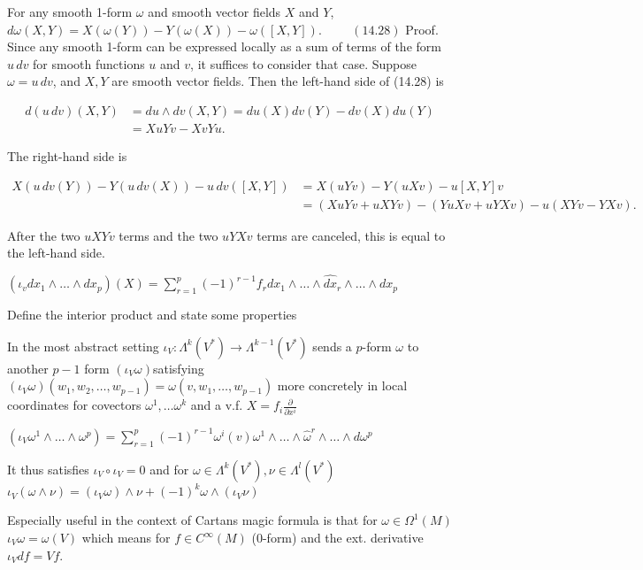 For any smooth 1-form \(\omega\) and smooth vector fields \( X \) and \( Y \), 
\(
d\omega(X,Y) = X(\omega(Y)) - Y(\omega(X)) - \omega([X, Y]). \hspace{1cm} (14.28)
\)
Proof.
Since any smooth 1-form can be expressed locally as a sum of terms of the form $u \, dv$ for smooth functions $u$ and $v$, it suffices to consider that case. 
Suppose \(\omega = u \, dv\), and \(X, Y\) are smooth vector fields. Then the left-hand side of (14.28) is

\[
\begin{aligned}
d(u \, dv)(X,Y) &= du \wedge dv(X,Y) = du(X) dv(Y) - dv(X) du(Y) \\
&= Xu Yv - Xv Yu. 
\end{aligned}
\]

The right-hand side is

\[
\begin{aligned}
X(u \, dv(Y)) - Y(u \, dv(X)) - u \, dv ([X, Y]) &= X(u Yv) - Y(u Xv) - u [X, Y] v \\
&= (Xu Yv + uXYv) - (Yu Xv + uYXv) - u(XYv - YXv). 
\end{aligned}
\]

After the two \(uXYv\) terms and the two \(uYXv\) terms are canceled, this is equal to the left-hand side.




\( (\iota_v dx_1 \wedge \dots \wedge dx_p)(X) = \sum^{p}_{r=1} (-1)^{r-1}f_r dx_1 \wedge \dots \wedge \hat{dx}_r \wedge \dots \wedge dx_p \)

Define the interior product and state some properties

In the most abstract setting \( \iota_V : \Lambda^k(V^\ast) \to \Lambda^{k-1}(V^\ast) \)
sends a \( p \)-form \( \omega \) to another \( p-1 \) form \( (\iota_V \omega) \)satisfying
\( (\iota_V\omega)(w_1, w_2, \dots, w_{p-1}) = \omega(v, w_1, \dots, w_{p-1})  \)
more concretely in local coordinates for covectors \( \omega^1, \dots \omega^k \) 
and a v.f. \( X = f_i \frac{\partial}{\partial x^i} \)

\( (\iota_V \omega^1 \wedge \dots \wedge \omega^p) = \sum^{p}_{r=1} (-1)^{r-1} \omega^i(v) \omega^1 \wedge \dots \wedge \hat{\omega}^r \wedge \dots \wedge d\omega^p \)

It thus satisfies
\( \iota_V \circ \iota_V = 0 \)
and for \( \omega \in \Lambda^k(V^\ast), \nu \in \Lambda^l(V^\ast)\)
\( \iota_V(\omega \wedge \nu) = (\iota_V \omega) \wedge \nu + (-1)^k \omega \wedge (\iota_V \nu) \)

Especially useful in the context of Cartans magic formula is that for \( \omega \in \Omega^1(M) \)
\( \iota_V \omega = \omega(V) \)
which means for \( f \in C^\infty(M) \) (0-form) and the ext. derivative
\( \iota_V df = Vf \).

